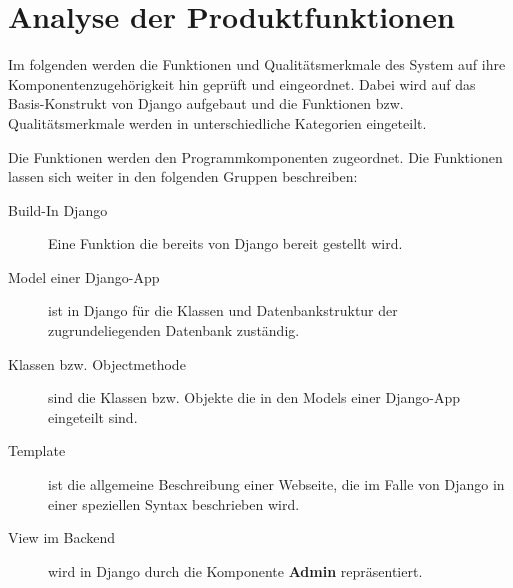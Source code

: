 \chapter{Analyse der Produktfunktionen}

%
%
Im folgenden werden die Funktionen und Qualitätsmerkmale des System auf ihre
Komponentenzugehörigkeit hin geprüft und eingeordnet. Dabei wird auf das
Basis-Konstrukt von Django aufgebaut und die Funktionen bzw. Qualitätsmerkmale
werden in unterschiedliche Kategorien eingeteilt.

Die Funktionen werden den Programmkomponenten zugeordnet. Die Funktionen lassen
sich weiter in den folgenden Gruppen beschreiben:
\begin{description}
	\item[Build-In Django] Eine Funktion die bereits von Django bereit gestellt
	  wird.
	\item[Model einer Django-App] ist in Django für die Klassen und
	  Datenbankstruktur der zugrundeliegenden Datenbank zuständig.
	\item[Klassen bzw. Objectmethode] sind die Klassen bzw. Objekte die in den
	  Models einer Django-App eingeteilt sind.
	\item[Template] ist die allgemeine Beschreibung einer Webseite, die im Falle
	  von Django in einer speziellen Syntax beschrieben wird.
	\item[View im Backend] wird in Django durch die Komponente \textbf{Admin}
	  repräsentiert.
\end{description}

